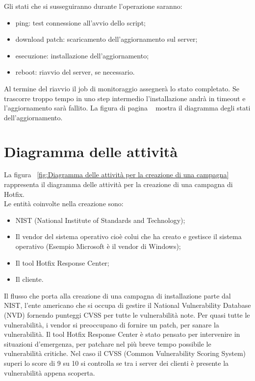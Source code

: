 \noindent Gli stati che si susseguiranno durante l’operazione saranno:
\begin{itemize}
\item ping: test connessione all’avvio dello script; 
\item download patch: scaricamento dell’aggiornamento sul server;
\item esecuzione: installazione dell’aggiornamento;
\item reboot: riavvio del server, se necessario.
\end{itemize}
Al termine del riavvio il job di monitoraggio assegnerà lo stato 
completato. Se trascorre troppo tempo in uno step intermedio 
l’installazione andrà in timeout e l’aggiornamento sarà fallito.
La figura di pagina ~\pageref{fig:Diagramma a stati dell'aggiornamento di un server}
mostra il diagramma degli stati dell'aggiornamento.

\section{Diagramma delle attività}
La figura ~\ref{fig:Diagramma delle attività per la creazione di una campagna} 
rappresenta il diagramma delle attività per la creazione di una campagna di Hotfix.\\

\noindent Le entità coinvolte nella creazione sono:
\begin{itemize}
\item NIST (National Institute of Standards and Technology);
\item Il vendor del sistema operativo cioè colui che ha creato e gestisce il 
sistema operativo (Esempio Microsoft è il vendor di Windows);
\item Il tool Hotfix Response Center;
\item Il cliente.
\end{itemize}

Il flusso che porta alla creazione di una campagna di installazione 
parte dal NIST, l’ente americano che si occupa di gestire il National 
Vulnerability Database (NVD) fornendo punteggi CVSS per tutte le 
vulnerabilità note. Per quasi tutte le vulnerabilità, i vendor si preoccupano 
di fornire un patch, per sanare la vulnerabilità.
Il tool Hotfix Response Center è stato pensato per intervenire in situazioni 
d'emergenza, per patchare nel più breve tempo possibile le vulnerabilità critiche. 
Nel caso il CVSS (Common Vulnerability Scoring System) superi lo score di 9 su 
10 si controlla se tra i server dei clienti è presente la vulnerabilità appena scoperta.

